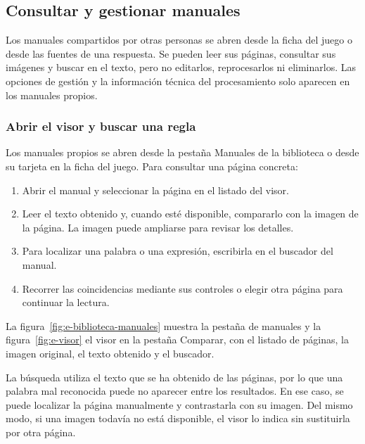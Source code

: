 \subsection{Consultar y gestionar manuales}
\label{sec:e-visor}

Los manuales compartidos por otras personas se abren desde la ficha del juego
o desde las fuentes de una respuesta. Se pueden leer sus páginas, consultar
sus imágenes y buscar en el texto, pero no editarlos, reprocesarlos ni
eliminarlos. Las opciones de gestión y la información técnica del
procesamiento solo aparecen en los manuales propios.

\subsubsection{Abrir el visor y buscar una regla}

Los manuales propios se abren desde la pestaña
\guillemotleft{}Manuales\guillemotright{} de la biblioteca o desde su
tarjeta en la ficha del juego. Para consultar una página concreta:

\begin{enumerate}
    \item Abrir el manual y seleccionar la página en el listado del visor.
    \item Leer el texto obtenido y, cuando esté disponible, compararlo con
    la imagen de la página. La imagen puede ampliarse para revisar los
    detalles.
    \item Para localizar una palabra o una expresión, escribirla en el
    buscador del manual.
    \item Recorrer las coincidencias mediante sus controles o elegir otra
    página para continuar la lectura.
\end{enumerate}

La figura~\ref{fig:e-biblioteca-manuales} muestra la pestaña de manuales
y la figura~\ref{fig:e-visor} el visor en la pestaña \guillemotleft{}Comparar\guillemotright{},
con el listado de páginas, la imagen original, el texto obtenido y el
buscador.



La búsqueda utiliza el texto que se ha obtenido de las páginas, por lo que
una palabra mal reconocida puede no aparecer entre los resultados. En ese
caso, se puede localizar la página manualmente y contrastarla con su imagen.
Del mismo modo, si una imagen todavía no está disponible, el visor lo
indica sin sustituirla por otra página.

